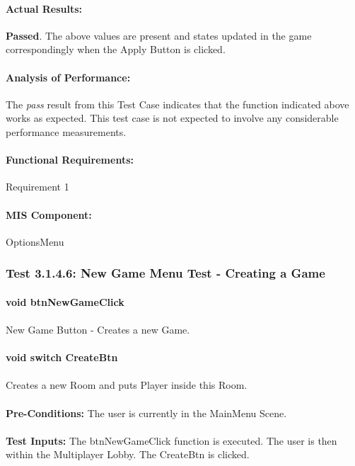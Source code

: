 \documentclass{article}
\begin{document}
    \paragraph{Actual Results:} \textbf{Passed}. The above values are present and states updated in the game correspondingly when the Apply Button is clicked.
    \paragraph{Analysis of Performance:} The \emph{pass} result from this Test Case indicates that the function indicated above works as expected. This test case is not expected to involve any considerable performance measurements.
    \paragraph{Functional Requirements:} Requirement 1
    \paragraph{MIS Component:} OptionsMenu
    
     \subsubsection{Test 3.1.4.6: New Game Menu Test - Creating a Game }
    \paragraph{}\textbf{void btnNewGameClick}
    \paragraph{} New Game Button - Creates a new Game.
    \paragraph{}\textbf{void switch CreateBtn}
    \paragraph{} Creates a new Room and puts Player inside this Room.
    \paragraph{}\textbf{Pre-Conditions:} The user is currently in the MainMenu Scene.
    \paragraph{}\textbf{Test Inputs:} The btnNewGameClick function is executed. The user is then within the Multiplayer Lobby. The CreateBtn is clicked. 
\end{document}
